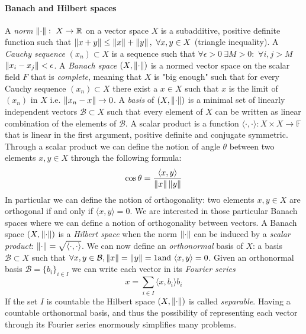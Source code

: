 \paragraph{Banach and Hilbert spaces}
A \textit{norm} $\left\lVert\cdot\right\rVert:\ X\to\mathbb R$ on a vector space $X$ is a subadditive, positive definite function such that $\left\lVert x+y\right\rVert\leq\left\lVert x\right\rVert +\left\lVert y\right\rVert,\ \forall x,y\in X$ (triangle inequality). A \textit{Cauchy sequence} $(x_n)\subset X$ is a sequence such that $\forall \epsilon>0\  \exists M>0: $ $\forall i,j>M$ $ \left\lVert x_i-x_j\right\rVert<\epsilon$. A \textit{Banach space} $(X, \left\lVert\cdot\right\rVert)$ is a normed vector space on the scalar field $F$ that is \textit{complete}, meaning that $X$ is "big enough" such that for every Cauchy sequence $(x_n)\subset X$ there exist a $x\in X$ such that $x$ is the limit of $(x_n)$ in $X$ i.e. $\left\lVert x_n-x\right\rVert\rightarrow 0$. A \textit{basis} of $(X, \left\lVert\cdot\right\rVert)$ is a minimal set of linearly independent vectors $\mathcal B \subset X$ such that every element of $X$ can be written as linear combination of the elements of $\mathcal B$. A scalar product is a function $\langle\cdot,\cdot\rangle: X\times X \rightarrow \mathbb F$ that is linear in the first argument, positive definite and conjugate symmetric. Through a scalar product we can define the notion of angle $\theta$ between two elements $x, y \in X$ through the following formula: 
$$
\cos \theta = \frac{\langle x, y\rangle}{\left\lVert x\right\rVert \left\lVert y\right\rVert}
$$ 
In particular we can define the notion of orthogonality: two elements  $x, y \in X$ are orthogonal if and only if $\langle x, y\rangle=0$. We are interested in those particular Banach spaces where we can define a notion of orthogonality between vectors. A Banach space $(X, \left\lVert\cdot\right\rVert )$ is a \textit{Hilbert space} when the norm $ \left\lVert\cdot\right\rVert $ can be induced by a \textit{scalar product}: $\left\lVert\cdot\right\rVert = \sqrt{\langle\cdot,\cdot\rangle}$. We can now define an \textit{orthonormal} basis of $X$: a basis $\mathcal B \subset X$ such that $\forall x, y \in \mathcal B, \left\lVert x\right\rVert = \left\lVert y\right\rVert = 1 \text{and } \langle x, y\rangle = 0$. Given an orthonormal basis $\mathcal B = \{b_i\}_{i\in I}$ we can write each vector in its \textit{Fourier series} 
\begin{equation}\label{eq:abstract fourier}
x = \sum_{i\in I} \langle x, b_i\rangle b_i
\end{equation}
If the set $I$ is countable the Hilbert space $(X, \left\lVert\cdot\right\rVert)$ is called \textit{separable}. Having a countable orthonormal basis, and thus the possibility of representing each vector through its Fourier series enormously simplifies many problems.
